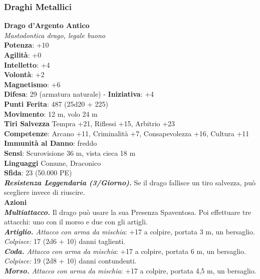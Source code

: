 \begin{multicols}{2}
\subsubsection{Draghi Metallici}

\medskip\textbf{Drago d'Argento Antico}\\
\emph{Mastodontica drago, legale buono}\\
\textbf{Potenza}: +10\\
\textbf{Agilità}: +0\\
\textbf{Intelletto}: +4\\
\textbf{Volontà}: +2\\
\textbf{Magnetismo}: +6\\
\textbf{Difesa}: 29 (armatura naturale) - \textbf{Iniziativa}: +4\\
\textbf{Punti Ferita}: 487 (25d20 + 225) \\
\textbf{Movimento}: 12 m, volo 24 m\\
\textbf{Tiri Salvezza} Tempra +21, Riflessi +15, Arbitrio +23\\
\textbf{Competenze}: Arcano +11, Criminalità +7, Consapevolezza +16, Cultura +11\\
\textbf{Immunità al Danno}: freddo\\
\textbf{Sensi}: Scurovisione 36 m, vista cieca 18 m\\
\textbf{Linguaggi} Comune, Draconico\\
\textbf{Sfida}: 23 (50.000 PE)\smallskip\\
\emph{\textbf{Resistenza Leggendaria (3/Giorno).}} Se il drago fallisce un tiro salvezza, può scegliere invece di riuscire.\\
\smallskip\textbf{Azioni} \\
\emph{\textbf{Multiattacco.}} Il drago può usare la sua Presenza Spaventosa. Poi effettuare tre attacchi: uno con il morso e due con gli artigli.\\
\emph{\textbf{Artiglio.} Attacco con arma da mischia}: +17 a colpire, portata 3 m, un bersaglio.\\
\emph{Colpisce:} 17 (2d6 + 10) danni taglienti.\\
\emph{\textbf{Coda.} Attacco con arma da mischia}: +17 a colpire, portata 6 m, un bersaglio.\\
\emph{Colpisce:} 19 (2d8 + 10) danni contundenti. \\
\emph{\textbf{Morso.} Attacco con arma da mischia}: +17 a colpire, portata 4,5 m, un bersaglio.\\

\end{multicols}
